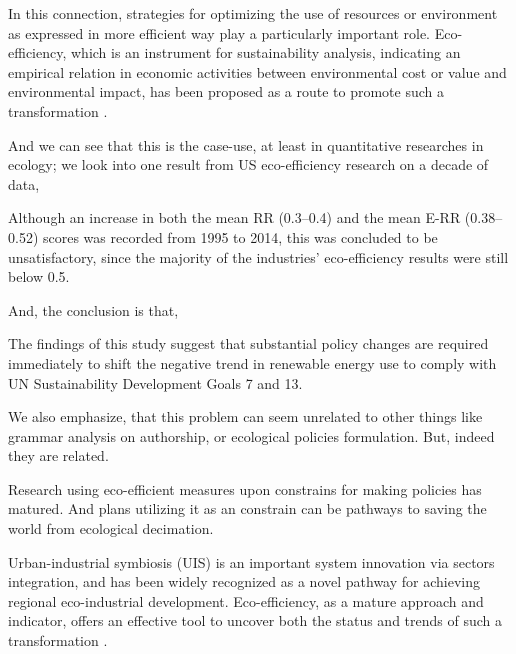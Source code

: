 \documentclass[
12pt,				%
openright,			%
oneside,			%
a4paper,			%
brazil,				%
english,			  %
]{abntex2}
\begin{document}
\begin{citacao}
 In this connection, strategies for optimizing the use of resources or
environment as expressed in more efficient way play a
particularly important role. Eco-efficiency, which is an instrument for sustainability analysis, indicating an empirical
relation in economic activities between environmental cost
or value and environmental impact, has been proposed as a
route to promote such a transformation \cite{mickwitz2006regional}.
\end{citacao}

And we can see that this is the case-use, at least in quantitative
researches in ecology; we look into one result from US eco-efficiency research on a decade of data,

\begin{citacao}
 Although an increase in both the mean RR (0.3–0.4) and the mean E-RR
 (0.38–0.52) scores was recorded from 1995 to 2014, this was concluded
 to be unsatisfactory, since the majority of the industries’
 eco-efficiency results were still below 0.5. \cite{ezici2020assessing}
\end{citacao}

And, the conclusion is that,

\begin{citacao}
The findings of this study suggest that substantial policy changes are
required immediately to shift the negative trend in renewable energy
use to comply with UN Sustainability Development Goals 7 and 13. \cite{ezici2020assessing}
\end{citacao}



We also emphasize, that this problem can seem unrelated to other
things like grammar analysis on authorship, or ecological policies
formulation. But, indeed they are related. 

Research using eco-efficient measures upon constrains for making
policies has matured. And plans utilizing it as an constrain can be
pathways to saving the world from ecological decimation.

\begin{citacao}
Urban-industrial symbiosis (UIS) is an important system innovation via
sectors integration, and has been widely recognized as a novel pathway
for achieving regional eco-industrial development. Eco-efficiency, as
a mature approach and indicator, offers an effective tool to uncover
both the status and trends of such a transformation \cite{bian2020sectoral}.
\end{citacao}
\end{document}
